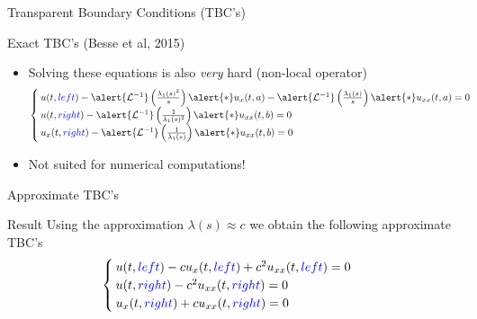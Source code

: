 \documentclass{beamer}
\newcommand{\laplinv}{\mathcal{L}^{-1}}
\begin{document}
    \begin{frame}{Transparent Boundary Conditions (TBC's)}
      \begin{block}{Exact TBC's (Besse et al, 2015)}
        \begin{itemize}
          \pause
          \item Solving these equations is also \alert{\emph{very}} hard (non-local operator)
            \begin{equation*}
              \begin{cases}
                      u(t,\textcolor{blue}{left}) - \alert{\laplinv} \left( \frac{\lambda_1(s)^2}{s} \right) \alert{*} u_x(t,a) - \alert{\laplinv} \left( \frac{\lambda_1(s)}{s} \right) \alert{*} u_{xx}(t,a) = 0 \\
                      u(t,\textcolor{blue}{right}) - \alert{\laplinv} \left( \frac{1}{\lambda_1(s)^2} \right) \alert{*} u_{xx}(t,b) = 0 \\
                      u_x(t,\textcolor{blue}{right}) - \alert{\laplinv} \left( \frac{1}{\lambda_1(s)} \right) \alert{*} u_{xx}(t,b) = 0
              \end{cases}
            \end{equation*}
            \pause
          \item Not suited for numerical computations!
        \end{itemize}
      \end{block}

    \end{frame}

    \begin{frame}{Approximate TBC's}
      \begin{block}{Result}
        Using the approximation $\lambda(s) \approx c$ we obtain the following approximate TBC's
        \begin{equation*}
            \begin{cases}
                u(t,\textcolor{blue}{left}) - c u_x(t,\textcolor{blue}{left})  + c^2  u_{xx}(t,\textcolor{blue}{left}) = 0 \\
                u(t,\textcolor{blue}{right}) - c^2    u_{xx}(t,\textcolor{blue}{right}) = 0 \\
                u_x(t,\textcolor{blue}{right}) + c u_{xx}(t,\textcolor{blue}{right})= 0
            \end{cases}
        \end{equation*}
      \end{block}

    \end{frame}
\end{document}
